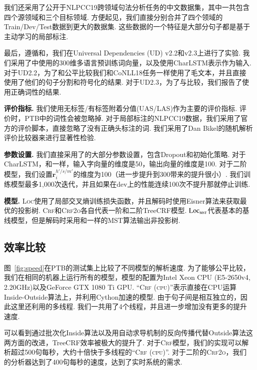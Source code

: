 我们还采用了公开于NLPCC19跨领域句法分析任务的中文数据集\cite{peng2019overview}，其中一共包含四个源领域和三个目标领域.
方便起见，我们直接分别合并了四个领域的Train/Dev/Test数据到更大的数据集.
这些数据的一个特征是大部分句子都是基于主动学习的局部标注.

最后，遵循\cite{ji-etal-2019-graph}和\cite{zhang-etal-2019-empirical}，我们在Universal Dependencies (UD) v2.2和v2.3上进行了实验.
我们采用了\cite{zeman-etal-2018-conll}中使用的300维多语言预训练词向量，以及使用CharLSTM表示作为输入.
对于UD2.2，为了和\cite{ji-etal-2019-graph}公平比较我们和CoNLL18任务一样\cite{zeman-etal-2018-conll}使用了毛文本，并且直接使用了他们的句子分割和符号化的结果.
对于UD2.3，为了与\cite{zhang-etal-2019-empirical}比较，我们报告了使用正确词性的结果.



\noindent\textbf{评价指标.}
我们使用无标签/有标签附着分值(UAS/LAS)作为主要的评价指标.
评价时，PTB中的词性会被忽略掉.
对于局部标注的NLPCC19数据，我们采用了官方的评价脚本，直接忽略了没有正确头标注的词.
我们采用了Dan Bikel的随机解析评价比较器来进行显著性检验.

\noindent\textbf{参数设置.}
我们直接采用了\cite{Timothy-d17-biaffine}的大部分参数设置，包含Dropout和初始化策略.
对于CharLSTM，和\cite{lample-etal-2016-neural}一样，输入字向量的维度是50，输出向量的维度是100.
对于二阶模型，我们设置$\mathbf{r}^{h'/s/m'}_i$的维度为100（进一步提升到300带来的提升很小）.
我们训练模型最多1,000次迭代，并且如果在dev上的性能连续100次不提升那就停止训练.

\noindent\textbf{模型.}
\textsc{Loc}使用了局部交叉熵训练损失函数，并且解码时使用Eisner算法来获取最优的投影树.
\textsc{Crf}和\textsc{Crf2o}各自代表一阶和二阶TreeCRF模型.
$\textsc{Loc}_{\textsc{mst}}$代表基本的基线模型，但是解码时采用和\cite{Timothy-d17-biaffine}一样的MST算法输出非投影树.

\subsection{效率比较}

图~\ref{fig:speed}在PTB的测试集上比较了不同模型的解析速度.
为了能够公平比较，我们在相同的机器上运行所有的模型，模型的配置为Intel Xeon CPU (E5-2650v4, 2.20GHz)以及GeForce GTX 1080 Ti GPU.
``\textsc{Crf (cpu)}''表示直接在CPU运算Inside-Outside算法上，并利用Cython加速的模型.
由于句子间是相互独立的，因此这里还利用的多线程.
我们一共用了4个线程，并且进一步增加没有更多的提升速度.

可以看到通过批次化Inside算法以及用自动求导机制的反向传播代替Outside算法这两方面的改进，TreeCRF效率被极大的提升了.
对于\textsc{Crf}模型，我们的实现可以解析超过500句每秒，大约十倍快于多线程的``\textsc{Crf (cpu)}''.
对于二阶的\textsc{Crf2o}，我们的分析器达到了400句每秒的速度，达到了实时系统的需求.

